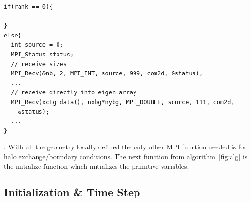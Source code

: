 \documentclass[paper=a4, fontsize=11pt]{scrartcl}
\numberwithin{equation}{section}                %
\numberwithin{figure}{section}                  %
\numberwithin{table}{section}                           %
\begin{document}
\begin{verbatim}
if(rank == 0){
  ...
}
else{
  int source = 0;
  MPI_Status status;
  // receive sizes
  MPI_Recv(&nb, 2, MPI_INT, source, 999, com2d, &status); 
  ...
  // receive directly into eigen array
  MPI_Recv(xcLg.data(), nxbg*nybg, MPI_DOUBLE, source, 111, com2d, 
    &status);
  ...
}
\end{verbatim}
. With all the geometry locally defined the only other MPI function needed is for halo exchange/boundary conditions. The next function from algorithm~\ref{fig:alg} is the initialize function which initializes the primitive variables.

\subsection{Initialization \& Time Step}\label{sec:code:init}
\end{document}
